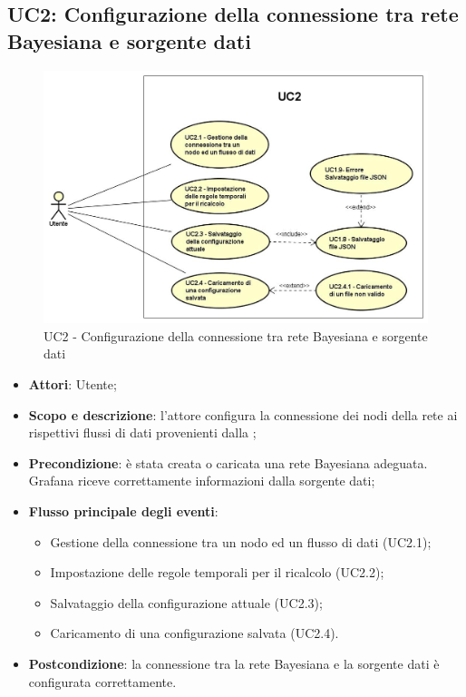 \subsection{UC2:  Configurazione della connessione tra rete Bayesiana e sorgente dati}
\hypertarget{UC2}{}
\begin{figure} [H]
	\centering
	\includegraphics[scale=0.45]{Img/UC2}
	\caption{UC2 - Configurazione della connessione tra rete Bayesiana e sorgente dati}\label{}
\end{figure}
\begin{itemize}
	\item \textbf{Attori}: Utente;
	\item \textbf{Scopo e descrizione}: l'attore configura la connessione dei nodi della rete ai rispettivi flussi di dati provenienti dalla ;
	\item \textbf{Precondizione}: è stata creata o caricata una rete Bayesiana adeguata. Grafana riceve correttamente informazioni dalla sorgente dati;
	\item \textbf{Flusso principale degli eventi}:
	\begin{itemize}
		\item Gestione della connessione tra un nodo ed un flusso di dati (UC2.1);
		\item Impostazione delle regole temporali per il ricalcolo (UC2.2);
		\item Salvataggio della configurazione attuale (UC2.3);
		\item Caricamento di una configurazione salvata (UC2.4).
	\end{itemize}
	\item \textbf{Postcondizione}: la connessione tra la rete Bayesiana e la sorgente dati è configurata correttamente.
\end{itemize}

